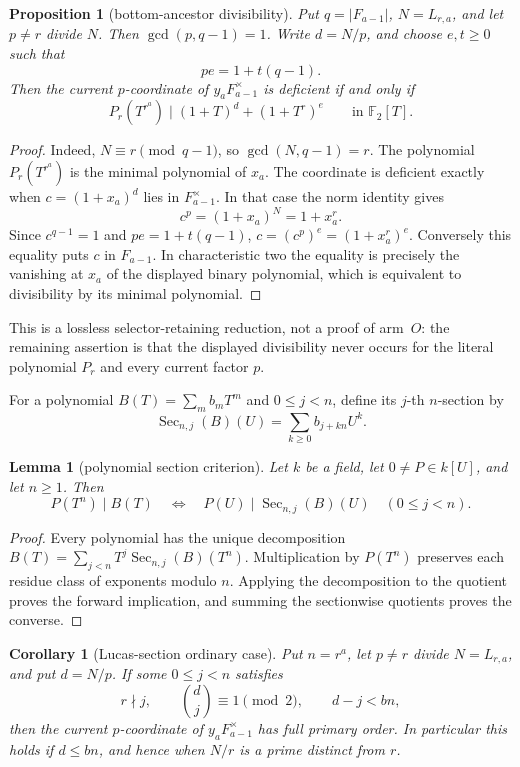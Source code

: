 \documentclass[11pt]{article}
\newtheorem{proposition}[theorem]{Proposition}
\newtheorem{lemma}[theorem]{Lemma}
\newtheorem{corollary}[theorem]{Corollary}
\theoremstyle{definition}
\theoremstyle{remark}
\begin{document}
\begin{proposition}[bottom-ancestor divisibility]
\label{prop:o-bottom-divisibility}
Put $q=|F_{a-1}|$, $N=L_{r,a}$, and let $p\ne r$ divide $N$.
Then $\gcd(p,q-1)=1$.  Write $d=N/p$, and choose $e,t\geq0$ such that
\[
 pe=1+t(q-1).
\]
Then the current $p$-coordinate of $y_aF_{a-1}^{\times}$ is deficient if
and only if
\[
 P_r(T^{r^a})\mid
 (1+T)^d+(1+T^r)^e
 \qquad\text{in }\mathbb F_2[T].
\]
\end{proposition}

\begin{proof}
Indeed, $N\equiv r\pmod {q-1}$, so
$\gcd(N,q-1)=r$.
The polynomial $P_r(T^{r^a})$ is the minimal polynomial of $x_a$.
The coordinate is deficient exactly when $c=(1+x_a)^d$ lies in
$F_{a-1}^{\times}$.  In that case the norm identity gives
\[
 c^p=(1+x_a)^N=1+x_a^r.
\]
Since $c^{q-1}=1$ and $pe=1+t(q-1)$,
$c=(c^p)^e=(1+x_a^r)^e$.  Conversely this equality puts $c$ in
$F_{a-1}$.  In characteristic two the equality is precisely the vanishing
at $x_a$ of the displayed binary polynomial, which is equivalent to
divisibility by its minimal polynomial.
\end{proof}

This is a lossless selector-retaining reduction, not a proof of arm~$O$:
the remaining assertion is that the displayed divisibility never occurs for
the literal polynomial $P_r$ and every current factor $p$.

For a polynomial $B(T)=\sum_m b_mT^m$ and $0\leq j<n$, define its
$j$-th $n$-section by
\[
 \operatorname{Sec}_{n,j}(B)(U)=\sum_{k\geq0}b_{j+kn}U^k.
\]

\begin{lemma}[polynomial section criterion]
\label{lem:o-section}
Let $k$ be a field, let $0\ne P\in k[U]$, and let $n\geq1$.  Then
\[
 P(T^n)\mid B(T)
 \quad\Longleftrightarrow\quad
 P(U)\mid\operatorname{Sec}_{n,j}(B)(U)
 \quad(0\leq j<n).
\]
\end{lemma}

\begin{proof}
Every polynomial has the unique decomposition
$B(T)=\sum_{j<n}T^j\operatorname{Sec}_{n,j}(B)(T^n)$.
Multiplication by $P(T^n)$ preserves each residue class of exponents modulo
$n$.  Applying the decomposition to the quotient proves the forward
implication, and summing the sectionwise quotients proves the converse.
\end{proof}

\begin{corollary}[Lucas-section ordinary case]
\label{cor:o-large-factor}
Put $n=r^a$, let $p\ne r$ divide $N=L_{r,a}$, and put $d=N/p$.
If some $0\leq j<n$ satisfies
\[
 r\nmid j,\qquad \binom dj\equiv1\pmod2,
 \qquad d-j<bn,
\]
then the current $p$-coordinate of $y_aF_{a-1}^{\times}$ has full primary
order.  In particular this holds if $d\leq bn$, and hence when $N/r$ is a
prime distinct from $r$.
\end{corollary}
\end{document}
